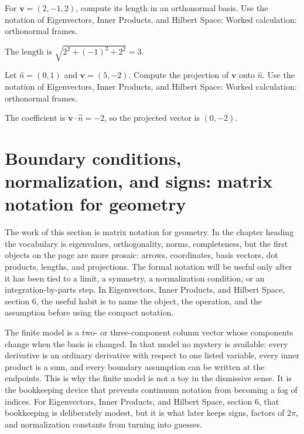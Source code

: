 \begin{exercise}
For \(\bm v=(2,-1,2)\), compute its length in an orthonormal basis.  Use the notation of Eigenvectors, Inner Products, and Hilbert Space: Worked calculation: orthonormal frames.
\begin{answer}
The length is \(\sqrt{2^2+(-1)^2+2^2}=3\).
\end{answer}
\end{exercise}

\begin{exercise}
Let \(\hat n=(0,1)\) and \(\bm v=(5,-2)\).  Compute the projection of \(\bm v\) onto \(\hat n\).  Use the notation of Eigenvectors, Inner Products, and Hilbert Space: Worked calculation: orthonormal frames.
\begin{answer}
The coefficient is \(\bm v\cdot\hat n=-2\), so the projected vector is \((0,-2)\).
\end{answer}
\end{exercise}



\section{Boundary conditions, normalization, and signs: matrix notation for geometry}

The work of this section is matrix notation for geometry.  In the chapter heading the vocabulary is eigenvalues, orthogonality, norms, completeness, but the first objects on the page are more prosaic: arrows, coordinates, basis vectors, dot products, lengths, and projections.  The formal notation will be useful only after it has been tied to a limit, a symmetry, a normalization condition, or an integration-by-parts step.  In Eigenvectors, Inner Products, and Hilbert Space, section 6, the useful habit is to name the object, the operation, and the assumption before using the compact notation.

The finite model is a two- or three-component column vector whose components change when the basis is changed.  In that model no mystery is available: every derivative is an ordinary derivative with respect to one listed variable, every inner product is a sum, and every boundary assumption can be written at the endpoints.  This is why the finite model is not a toy in the dismissive sense.  It is the bookkeeping device that prevents continuum notation from becoming a fog of indices.  For Eigenvectors, Inner Products, and Hilbert Space, section 6, that bookkeeping is deliberately modest, but it is what later keeps signs, factors of \(2\pi\), and normalization constants from turning into guesses.


